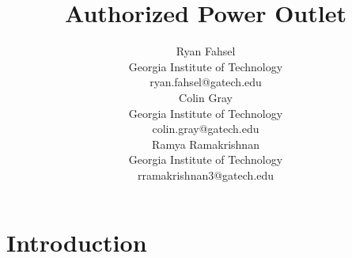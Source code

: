 \documentclass{sigchi}
\begin{document}
\title{Authorized Power Outlet}

\author{
  \alignauthor Ryan Fahsel\\
    \affaddr Georgia Institute of Technology\\
    \email ryan.fahsel@gatech.edu\\
  \alignauthor Colin Gray\\
    \affaddr Georgia Institute of Technology\\
    \email colin.gray@gatech.edu\\
  \alignauthor Ramya Ramakrishnan\\
    \affaddr Georgia Institute of Technology\\
    \email rramakrishnan3@gatech.edu\\
}

\maketitle

\begin{abstract}

\end{abstract}






\section{Introduction}
\end{document}
